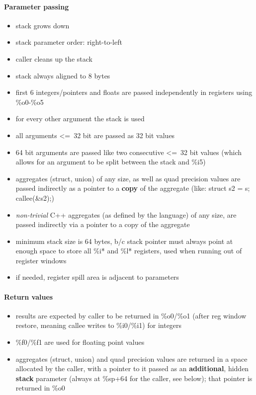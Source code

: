 \paragraph{Parameter passing}
\begin{itemize}
\item stack grows down
\item stack parameter order: right-to-left
\item caller cleans up the stack
\item stack always aligned to 8 bytes
\item first 6 integers/pointers and floats are passed independently in registers using \%o0-\%o5
\item for every other argument the stack is used
\item all arguments \textless=\ 32 bit are passed as 32 bit values
\item 64 bit arguments are passed like two consecutive \textless=\ 32 bit values (which allows for an argument to be split between the stack and \%i5)
\item aggregates (struct, union) of any size, as well as quad precision values are passed indirectly as a pointer to a {\bf copy} of the aggregate (like: struct s2 = s; callee(\&s2);)
\item {\it non-trivial} C++ aggregates (as defined by the language) of any size, are passed indirectly via a pointer to a copy of the aggregate
\item minimum stack size is 64 bytes, b/c stack pointer must always point at enough space to store all \%i* and \%l* registers, used when running out of register windows
\item if needed, register spill area is adjacent to parameters
\end{itemize}

\paragraph{Return values}

\begin{itemize}
\item results are expected by caller to be returned in \%o0/\%o1 (after reg window restore, meaning callee writes to \%i0/\%i1) for integers
\item \%f0/\%f1 are used for floating point values
\item aggregates (struct, union) and quad precision values are returned in a space allocated by the caller, with a pointer to it passed
as an {\bf additional}, hidden {\bf stack} parameter (always at \%sp+64 for the caller, see below); that pointer is returned in \%o0
\end{itemize}

